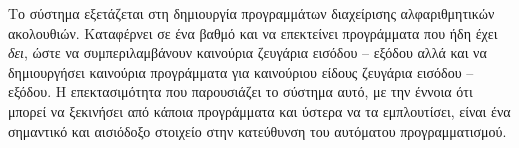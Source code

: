 Το σύστημα εξετάζεται στη δημιουργία προγραμμάτων διαχείρισης αλφαριθμητικών ακολουθιών. Καταφέρνει σε ένα βαθμό και να επεκτείνει προγράμματα που ήδη έχει \textit{δει}, ώστε να συμπεριλαμβάνουν καινούρια ζευγάρια εισόδου -- εξόδου αλλά και να δημιουργήσει καινούρια προγράμματα για καινούριου είδους ζευγάρια εισόδου -- εξόδου. Η επεκτασιμότητα που παρουσιάζει το σύστημα αυτό, με την έννοια ότι μπορεί να ξεκινήσει από κάποια προγράμματα και ύστερα να τα εμπλουτίσει, είναι ένα σημαντικό και αισιόδοξο στοιχείο στην κατεύθυνση του αυτόματου προγραμματισμού. 
